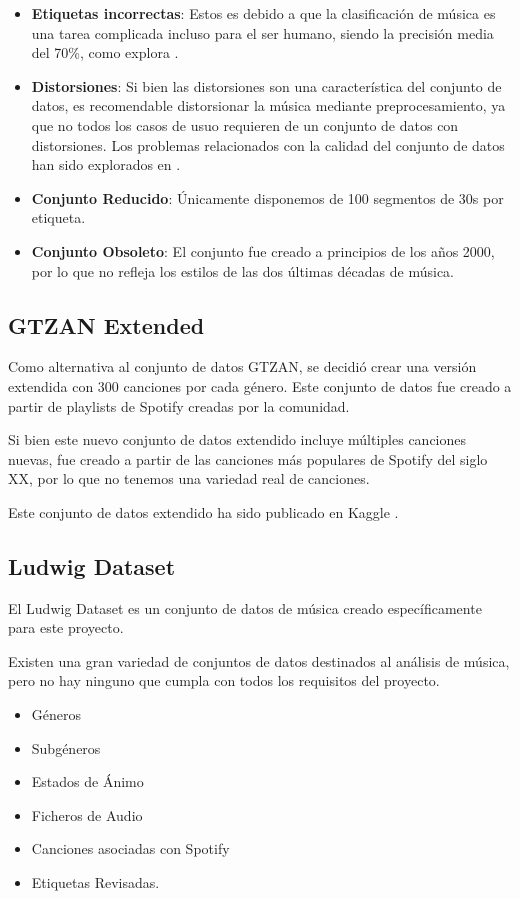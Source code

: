 \begin{itemize}
\itemsep0em
\item
  \textbf{Etiquetas incorrectas}: Estos es debido a que la clasificación
  de música es una tarea complicada incluso para el ser humano, siendo
  la precisión media del 70\%, como explora \cite{cnn_vs_human_acc_music}.
\item
  \textbf{Distorsiones}: Si bien las distorsiones son una característica
  del conjunto de datos, es recomendable distorsionar la música mediante
  preprocesamiento, ya que no todos los casos de usuo requieren de un conjunto de 
  datos con distorsiones. Los problemas relacionados 
  con la calidad del conjunto de datos han sido explorados en \cite{gtzan_analysis}.
\item
  \textbf{Conjunto Reducido}: Únicamente disponemos de 100 segmentos de
  30s por etiqueta.
\item
  \textbf{Conjunto Obsoleto}: El conjunto fue creado a principios de los
  años 2000, por lo que no refleja los estilos de las dos últimas décadas de música.
\end{itemize}


\subsection{GTZAN Extended}\label{gtzan-extended}

Como alternativa al conjunto de datos GTZAN, se decidió crear una versión
extendida con 300 canciones por cada género. Este conjunto de datos fue
creado a partir de playlists de Spotify creadas por la comunidad.

Si bien este nuevo conjunto de datos extendido incluye múltiples
canciones nuevas, fue creado a partir de las canciones más populares de
Spotify del siglo XX, por lo que no tenemos una variedad real de
canciones.

Este conjunto de datos extendido ha sido publicado en Kaggle \cite{GtzanExt16:online}.


\subsection{Ludwig Dataset}\label{ludwig-dataset} 

El Ludwig Dataset \cite{LudwigMu18:online} es un conjunto de datos de música creado
específicamente para este proyecto.

Existen una gran variedad de conjuntos de datos destinados al análisis
de música, pero no hay ninguno que cumpla con todos los requisitos del
proyecto.
\begin{itemize}

\itemsep0em
\item
  Géneros
\item
  Subgéneros
\item
  Estados de Ánimo
\item
  Ficheros de Audio
\item
  Canciones asociadas con Spotify
\item
  Etiquetas Revisadas. 
\end{itemize}

